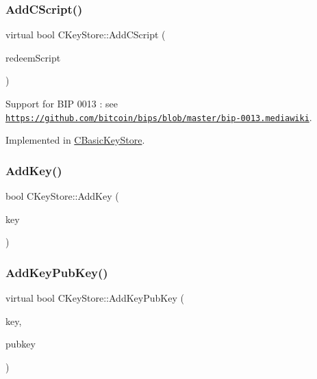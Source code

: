 \subsubsection{\texorpdfstring{Add\+C\+Script()}{AddCScript()}}
{\footnotesize\ttfamily virtual bool C\+Key\+Store\+::\+Add\+C\+Script (\begin{DoxyParamCaption}\item[{const C\+Script \&}]{redeem\+Script }\end{DoxyParamCaption})\hspace{0.3cm}{\ttfamily [pure virtual]}}



Support for B\+IP 0013 \+: see \href{https://github.com/bitcoin/bips/blob/master/bip-0013.mediawiki}{\tt https\+://github.\+com/bitcoin/bips/blob/master/bip-\/0013.\+mediawiki}. 



Implemented in \mbox{\hyperlink{class_c_basic_key_store_a56249ce3540398999cd397eeb662e836}{C\+Basic\+Key\+Store}}.

\mbox{\label{class_c_key_store_a0b4ca43724cfcc6e2ea70c0baa192750}} 
\subsubsection{\texorpdfstring{Add\+Key()}{AddKey()}}
{\footnotesize\ttfamily bool C\+Key\+Store\+::\+Add\+Key (\begin{DoxyParamCaption}\item[{const \mbox{\hyperlink{class_c_key}{C\+Key}} \&}]{key }\end{DoxyParamCaption})\hspace{0.3cm}{\ttfamily [virtual]}}

\mbox{\label{class_c_key_store_a1956e4f5860ded321d6f697047d8236a}} 
\subsubsection{\texorpdfstring{Add\+Key\+Pub\+Key()}{AddKeyPubKey()}}
{\footnotesize\ttfamily virtual bool C\+Key\+Store\+::\+Add\+Key\+Pub\+Key (\begin{DoxyParamCaption}\item[{const \mbox{\hyperlink{class_c_key}{C\+Key}} \&}]{key,  }\item[{const \mbox{\hyperlink{class_c_pub_key}{C\+Pub\+Key}} \&}]{pubkey }\end{DoxyParamCaption})\hspace{0.3cm}{\ttfamily [pure virtual]}}




